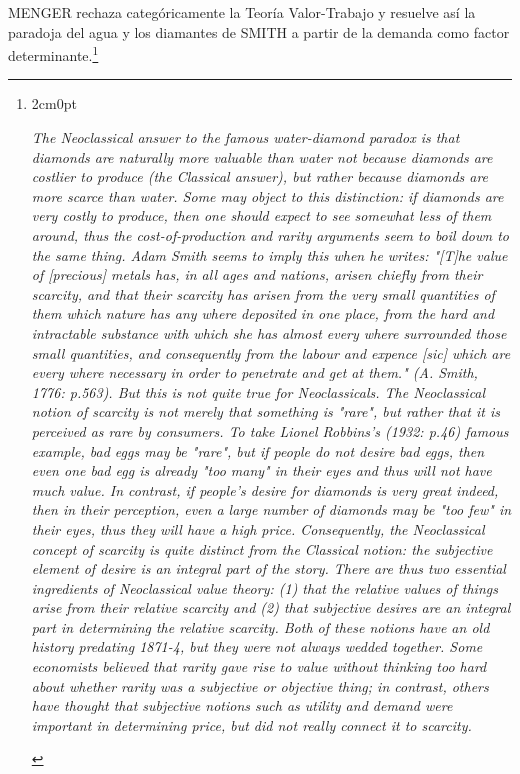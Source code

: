 \documentclass[10pt,a4paper]{article}
\begin{document}
MENGER rechaza categóricamente la Teoría Valor-Trabajo y resuelve así la paradoja del agua y los diamantes de SMITH a partir de la demanda como factor determinante.\footnote{%
    \begin{adjustwidth}{2cm}{0pt}
 \raggedright
 \textit{The Neoclassical answer to the famous \textit{water-diamond} paradox is that diamonds are naturally more valuable than water not because diamonds are costlier to produce (the Classical answer), but rather because diamonds are more scarce than water. Some may object to this distinction: if diamonds are very costly to produce, then one should expect to see somewhat less of them around, thus the cost-of-production and rarity arguments seem to boil down to the same thing. Adam Smith seems to imply this when he writes:
"[T]he value of [precious] metals has, in all ages and nations, arisen chiefly from their scarcity, and that their scarcity has arisen from the very small quantities of them which nature has any where deposited in one place, from the hard and intractable substance with which she has almost every where surrounded those small quantities, and consequently from the labour and expence [sic] which are every where necessary in order to penetrate and get at them." (A. Smith, 1776: p.563).
But this is not quite true for Neoclassicals. The Neoclassical notion of scarcity is not merely that something is "rare", but rather that it is perceived as rare by consumers. To take Lionel Robbins's (1932: p.46) famous example, bad eggs may be "rare", but if people do not desire bad eggs, then even one bad egg is already "too many" in their eyes and thus will not have much value. In contrast, if people's desire for diamonds is very great indeed, then in their perception, even a large number of diamonds may be "too few" in their eyes, thus they will have a high price. Consequently, the Neoclassical concept of scarcity is quite distinct from the Classical notion: the subjective element of desire is an integral part of the story.
There are thus two essential ingredients of Neoclassical value theory: (1) that the relative values of things arise from their relative scarcity and (2) that subjective desires are an integral part in determining the relative scarcity. Both of these notions have an old history predating 1871-4, but they were not always wedded together. Some economists believed that rarity gave rise to value without thinking too hard about whether rarity was a subjective or objective thing; in contrast, others have thought that subjective notions such as utility and demand were important in determining price, but did not really connect it to scarcity.}\\
\end{adjustwidth}
}
\end{document}
